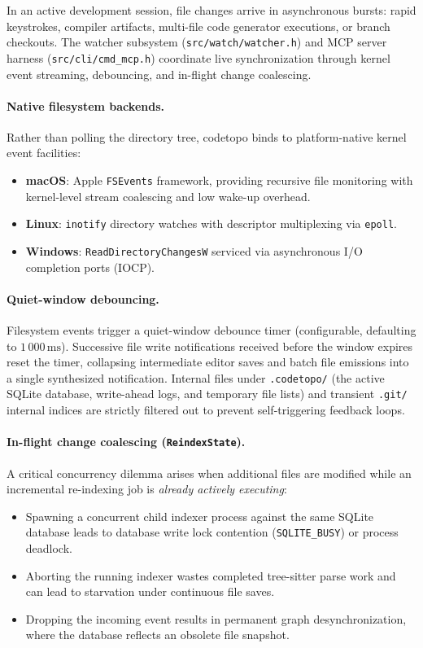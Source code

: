In an active development session, file changes arrive in asynchronous bursts: rapid keystrokes, compiler
artifacts, multi-file code generator executions, or branch checkouts. The watcher subsystem
(\texttt{src/watch/watcher.h}) and MCP server harness (\texttt{src/cli/cmd\_mcp.h}) coordinate live
synchronization through kernel event streaming, debouncing, and in-flight change coalescing.

\paragraph{Native filesystem backends.} Rather than polling the directory tree, codetopo binds to
platform-native kernel event facilities:
\begin{itemize}
  \item \textbf{macOS}: Apple \texttt{FSEvents} framework, providing recursive file monitoring with
        kernel-level stream coalescing and low wake-up overhead.
  \item \textbf{Linux}: \texttt{inotify} directory watches with descriptor multiplexing via \texttt{epoll}.
  \item \textbf{Windows}: \texttt{ReadDirectory\allowbreak ChangesW} serviced via asynchronous I/O completion ports (IOCP).
\end{itemize}

\paragraph{Quiet-window debouncing.} Filesystem events trigger a quiet-window debounce timer
(configurable, defaulting to $1\,000\,\mathrm{ms}$). Successive file write notifications received before the
window expires reset the timer, collapsing intermediate editor saves and batch file emissions into a single
synthesized notification. Internal files under \texttt{.codetopo/} (the active SQLite database, write-ahead
logs, and temporary file lists) and transient \texttt{.git/} internal indices are strictly filtered out
to prevent self-triggering feedback loops.

\paragraph{In-flight change coalescing (\texttt{ReindexState}).} A critical concurrency dilemma arises
when additional files are modified while an incremental re-indexing job is \emph{already actively executing}:
\begin{itemize}
  \item Spawning a concurrent child indexer process against the same SQLite database leads to database write
        lock contention (\texttt{SQLITE\_BUSY}) or process deadlock.
  \item Aborting the running indexer wastes completed tree-sitter parse work and can lead to starvation under
        continuous file saves.
  \item Dropping the incoming event results in permanent graph desynchronization, where the database reflects
        an obsolete file snapshot.
\end{itemize}


